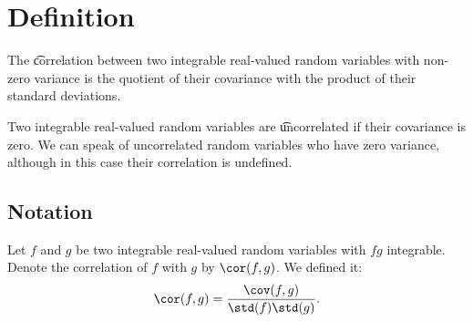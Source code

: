 

\section*{Definition}

The \t{correlation} between two integrable real-valued random variables with non-zero variance is the quotient of their covariance with the product of their standard deviations.

Two integrable real-valued random variables are \t{uncorrelated}
if their covariance is zero.
We can speak of uncorrelated random variables who have zero variance, although in this case their correlation is undefined.

\subsection*{Notation}

Let $f$ and $g$
be two integrable
real-valued
random variables
with $fg$ integrable.
Denote the correlation
of $f$ with $g$
by $\cor(f, g)$.
We defined it:
    \[
\cor(f, g) = \frac{\cov(f,g)}{\std(f)\std(g)}.
    \]

\blankpage